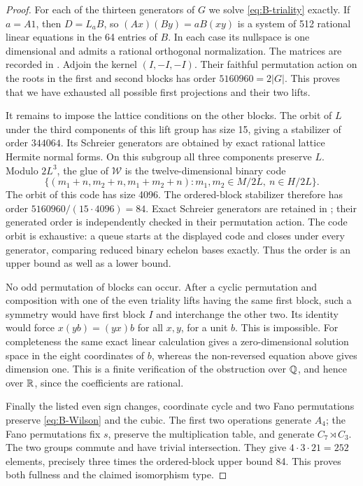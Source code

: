 \begin{proof}
For each of the thirteen generators of \(G\) we solve
\eqref{eq:B-triality} exactly. If \(a=A1\), then \(D=L_aB\), so
\((Ax)(By)=aB(xy)\) is a system of 512 rational linear equations in
the 64 entries of \(B\). In each case its nullspace is one dimensional
and admits a rational orthogonal normalization. The matrices are
recorded in . Adjoin the kernel
\((I,-I,-I)\). Their faithful permutation action on the roots in
the first and second blocks has order \(5160960=2|G|\).
This proves that we have exhausted all possible first projections
and their two lifts.

It remains to impose the lattice conditions on the other blocks.
The orbit of \(L\) under the third components of this lift group
has size 15, giving a stabilizer of order \(344064\). Its Schreier
generators are obtained by exact rational lattice Hermite normal
forms. On this subgroup all three components preserve \(L\).
Modulo \(2L^3\), the glue of \(\mathcal W\) is the twelve-dimensional
binary code
\[
 \{(m_1+n,m_2+n,m_1+m_2+n):
        m_1,m_2\in M/2L,\ n\in H/2L\}.
\]
The orbit of this code has size 4096. The ordered-block stabilizer
therefore has order
\(5160960/(15\cdot4096)=84\). Exact Schreier generators are retained
in ; their generated order is
independently checked in their permutation action. The code orbit
is exhaustive: a queue starts at the displayed code and closes under
every generator, comparing reduced binary echelon bases exactly.
Thus the order is an upper bound as well as a lower bound.

No odd permutation of blocks can occur. After a cyclic permutation
and composition with one of the even triality lifts having the same
first block, such a symmetry would have first block \(I\) and
interchange the other two. Its identity would force
\(x(yb)=(yx)b\) for all \(x,y\), for a unit \(b\). This is
impossible. For completeness the same exact linear calculation gives
a zero-dimensional solution space in the eight coordinates of \(b\),
whereas the non-reversed equation above gives dimension one. This is
a finite verification of the obstruction over \(\mathbb Q\), and hence
over \(\mathbb R\), since the coefficients are rational.

Finally the listed even sign changes, coordinate cycle and two Fano
permutations preserve \eqref{eq:B-Wilson} and the cubic. The first
two operations generate \(A_4\); the Fano permutations fix \(s\),
preserve the multiplication table, and generate \(C_7\rtimes C_3\).
The two groups commute and have trivial intersection. They give
\(4\cdot3\cdot21=252\) elements, precisely three times the
ordered-block upper bound 84. This proves both fullness and the
claimed isomorphism type.
\end{proof}

